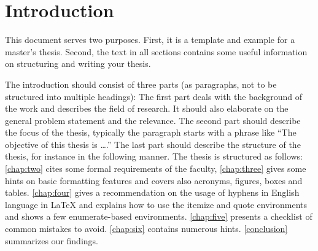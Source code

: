 \chapter{Introduction}
\label{chap:one}

This document serves two purposes. First, it is a template and example for a master's thesis. Second, the text in all sections contains some useful information on structuring and writing your thesis.

The introduction should consist of three parts (as paragraphs, not to be structured into multiple headings): The first part deals with the background of the work and describes the field of research. It should also elaborate on the general problem statement and the relevance. The second part should describe the focus of the thesis, typically the paragraph starts with a phrase like ``The objective of this thesis is \ldots.'' The last part should describe the structure of the thesis, for instance in the following manner. The thesis is structured as follows: \autoref{chap:two} cites some formal requirements of the faculty, \autoref{chap:three} gives some hints on basic formatting features and covers also acronyms, figures, boxes and tables. \autoref{chap:four} gives a recommendation on the usage of hyphens in English language in \LaTeX{} and explains how to use the itemize and quote environments and shows a few enumerate-based environments. \autoref{chap:five} presents a checklist of common mistakes to avoid. \autoref{chap:six} contains numerous hints. \autoref{conclusion} summarizes our findings.
